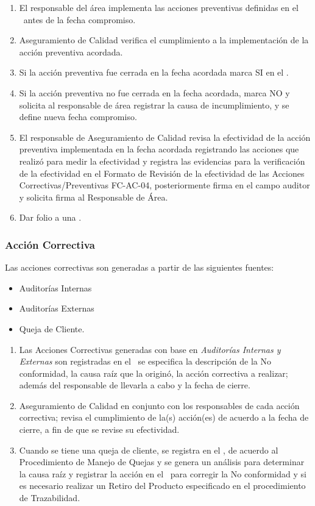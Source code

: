 \begin{enumerate}
\item El responsable del área implementa las acciones preventivas definidas en el \RAC~antes de la fecha compromiso.
\item Aseguramiento de Calidad verifica el cumplimiento a la implementación de la acción preventiva acordada.
\item Si la acción preventiva fue cerrada en la fecha acordada marca SI en el \RAC.
\item Si la acción preventiva no fue cerrada en la fecha acordada, marca NO y solicita al responsable de área registrar la causa de incumplimiento, y se define nueva fecha compromiso.
\item El responsable de Aseguramiento de Calidad revisa la efectividad de la acción preventiva implementada en la fecha acordada registrando las acciones que realizó para medir la efectividad y registra las evidencias para la verificación de la efectividad en el Formato de Revisión de la efectividad de las Acciones Correctivas/Preventivas FC-AC-04, posteriormente firma en el campo auditor y solicita firma al Responsable de Área.
\item Dar folio a una \RAC.
\end{enumerate}

\subsubsection{Acción Correctiva}
Las acciones correctivas son generadas a partir de las siguientes fuentes:

\begin{itemize}
	\item Auditorías Internas
	\item Auditorías Externas
	\item Queja de Cliente.
\end{itemize}

\begin{enumerate}
	\item Las Acciones Correctivas generadas con base en \emph{Auditorías Internas y Externas} son registradas en el \RAC~se especifica la descripción de la No conformidad, la causa raíz que la originó, la acción correctiva a realizar; además del responsable de llevarla a cabo y la fecha de cierre.
	\item Aseguramiento de Calidad en conjunto con los responsables de cada acción correctiva; revisa el cumplimiento de la(s) acción(es) de acuerdo a la fecha de cierre, a fin de que se revise su efectividad.
	\item Cuando se tiene una queja de cliente, se registra en el \RACQ, de acuerdo al Procedimiento de Manejo de Quejas y se genera un análisis para determinar la causa raíz y registrar la acción en el \RAC~para corregir la No conformidad y si es necesario realizar un Retiro del Producto especificado en el procedimiento de Trazabilidad.
	\end{enumerate}

